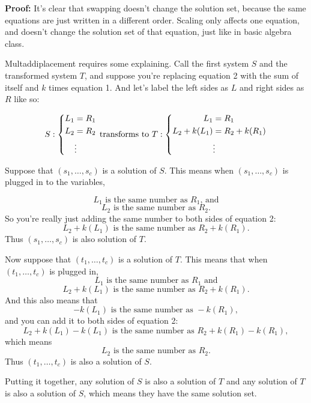 \documentclass[11pt, letterpaper]{report}
\newenvironment{book}{}{}
\let\originalleft\left
\let\originalright\right
\renewcommand{\left}{\mathopen{}\mathclose\bgroup\originalleft}
\renewcommand{\right}{\aftergroup\egroup\originalright}
\begin{document}
\begin{book}
\textbf{Proof:}  It's clear that swapping doesn't change the solution set, because the same equations are just written in a different order. Scaling only affects one equation, and doesn't change the solution set of that equation, just like in basic algebra class.

Multaddiplacement requires some explaining. Call the first system $S$ and the transformed system $T$, and suppose you're replacing equation 2 with the sum of itself and $k$ times equation 1. And let's label the left sides as $L$ and right sides as $R$ like so:

  \[ S: \left\{
      \begin{aligned}
        L_1 &= R_1 \\
        L_2 &= R_2 \\
            & \vdots
      \end{aligned} \right.
    \text{ transforms to } T: \left\{
      \begin{aligned}
        L_1 &= R_1 \\
        L_2 + k(L_1) &= R_2 + k(R_1) \\
            & \vdots
      \end{aligned}\right. \]

Suppose that $(s_1,\ldots,s_c)$ is a solution of $S$. This means when $(s_1,\ldots,s_c)$ is plugged in to the variables,

\[L_1\text{ is the same number as }R_1 \text{, and}\]
\[L_2\text{ is the same number as }R_2.\] So you're really just adding the same number to both sides of equation 2:
  \[L_2 + k(L_1)\text{ is the same number as }R_2 + k(R_1).\] Thus $(s_1,\ldots,s_c)$ is also solution of $T$.

Now suppose that $(t_1,\ldots,t_c)$ is a solution of $T$. This means that when $(t_1,\ldots,t_c)$ is plugged in,
  \[L_1\text{ is the same number as }R_1\text{ and}\]
  \[L_2 + k(L_1)\text{ is the same number as }R_2 + k(R_1).\]
And this also means that
  \[-k(L_1)\text{ is the same number as }-k(R_1),\]
and you can add it to both sides of equation 2:
  \[L_2+k(L_1) - k(L_1)\text{ is the same number as  }R_2+k(R_1) - k(R_1),\]
which means
  \[L_2\text{ is the same number as }R_2.\] Thus $(t_1,\ldots,t_c)$ is also a solution of $S.$

Putting it together, any solution of $S$ is also a solution of $T$ and any solution of $T$ is also a solution of $S$, which means they have the same solution set. \blacksquare
\end{book}
\end{document}
